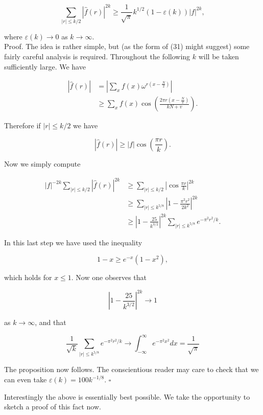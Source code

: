 \documentclass[10pt]{article}
\begin{document}
\begin{equation*}
\sum_{|r| \leq k / 2}|\hat{f}(r)|^{2 k} \geq \frac{1}{\sqrt{\pi}} k^{1 / 2}(1-\varepsilon(k))|f|^{2 k}, \tag{31}
\end{equation*}


where $\varepsilon(k) \rightarrow 0$ as $k \rightarrow \infty$.\\
Proof. The idea is rather simple, but (as the form of (31) might suggest) some fairly careful analysis is required. Throughout the following $k$ will be taken sufficiently large. We have

$$
\begin{aligned}
|\hat{f}(r)| & =\left|\sum_{x} f(x) \omega^{r\left(x-\frac{N}{2}\right)}\right| \\
& \geq \sum_{x} f(x) \cos \left(\frac{2 \pi r\left(x-\frac{N}{2}\right)}{k N+v}\right) .
\end{aligned}
$$

Therefore if $|r| \leq k / 2$ we have

$$
|\hat{f}(r)| \geq|f| \cos \left(\frac{\pi r}{k}\right) .
$$

Now we simply compute

$$
\begin{aligned}
|f|^{-2 k} \sum_{|r| \leq k / 2}|\hat{f}(r)|^{2 k} & \geq \sum_{|r| \leq k / 2}\left|\cos \frac{\pi r}{k}\right|^{2 k} \\
& \geq \sum_{|r| \leq k^{5 / 8}}\left|1-\frac{\pi^{2} r^{2}}{2 k^{2}}\right|^{2 k} \\
& \geq\left|1-\frac{25}{k^{3 / 2}}\right|^{2 k} \sum_{|r| \leq k^{5 / 8}} e^{-\pi^{2} r^{2} / k} .
\end{aligned}
$$

In this last step we have used the inequality

$$
1-x \geq e^{-x}\left(1-x^{2}\right),
$$

which holds for $x \leq 1$. Now one observes that

$$
\left|1-\frac{25}{k^{3 / 2}}\right|^{2 k} \longrightarrow 1
$$

as $k \rightarrow \infty$, and that

$$
\frac{1}{\sqrt{k}} \sum_{|r| \leq k^{5 / 8}} e^{-\pi^{2} r^{2} / k} \longrightarrow \int_{-\infty}^{\infty} e^{-\pi^{2} x^{2}} d x=\frac{1}{\sqrt{\pi}}
$$

The proposition now follows. The conscientious reader may care to check that we can even take $\varepsilon(k)=100 k^{-1 / 8}$. \(\square\)

Interestingly the above is essentially best possible. We take the opportunity to sketch a proof of this fact now.
\end{document}
